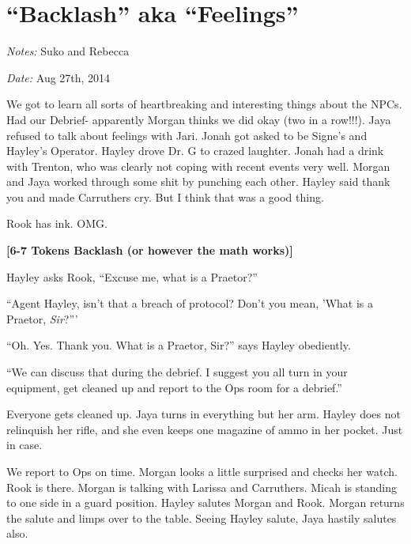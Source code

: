 \setcounter{chapter}{ 30 }
\chapter{\textbf{``Backlash'' aka ``Feelings''} }






\textit{Notes:} Suko and Rebecca

\textit{Date:} Aug 27th, 2014



We got to learn all sorts of heartbreaking and interesting things about the NPCs.  Had our Debrief- apparently Morgan thinks we did okay (two in a row!!!).  Jaya refused to talk about feelings with Jari.  Jonah got asked to be Signe's and Hayley's Operator.  Hayley drove Dr. G to crazed laughter.  Jonah had a drink with Trenton, who was clearly not coping with recent events very well.  Morgan and Jaya worked through some shit by punching each other.  Hayley said thank you and made Carruthers cry.  But I think that was a good thing.



Rook has ink.  OMG.



\noindent\hrulefill





\textbf{{[}6-7 Tokens Backlash (or however the math works){]}}



Hayley asks Rook, ``Excuse me, what is a Praetor?''

``Agent Hayley, isn't that a breach of protocol?  Don't you mean, 'What is a Praetor, \textit{Sir}?'''

``Oh.  Yes.  Thank you.  What is a Praetor, Sir?'' says Hayley obediently.

``We can discuss that during the debrief.  I suggest you all turn in your equipment, get cleaned up and report to the Ops room for a debrief.''



Everyone gets cleaned up.  Jaya turns in everything but her arm.  Hayley does not relinquish her rifle, and she even keeps one magazine of ammo in her pocket.  Just in case.



We report to Ops on time.  Morgan looks a little surprised and checks her watch.  Rook is there.  Morgan is talking with Larissa and Carruthers.  Micah is standing to one side in a guard position.  Hayley salutes Morgan and Rook.  Morgan returns the salute and limps over to the table.  Seeing Hayley salute, Jaya hastily salutes also.



